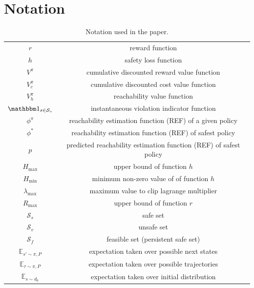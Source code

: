 \documentclass{article}
\theoremstyle{definition}
\DeclareMathOperator*{\E}{\mathbb{E}}
\begin{document}
\newpage

\appendix

\section{Notation}
\begin{table}[h]
    \centering
    \begin{tabular}{c|c}
         $r$& reward function \\
         $h$ & safety loss function\\
         $V^\pi$ & cumulative discounted reward value function \\
         $V^\pi_c$ & cumulative discounted cost value function \\
         $V^\pi_h$ & reachability value function\\
         $\mathbbm 1_{s\in \mathcal S_v} $ & instantaneous violation indicator function\\
         $\phi ^\pi$ & reachability estimation function (REF) of a given policy\\
         $\phi^*$ & reachability estimation function (REF) of safest policy \\
         $p$ & predicted reachability estimation function (REF) of safest policy\\
         $H_{\max}$ & upper bound of function $h$ \\
         $H_{\min}$ & minimum non-zero value of of function $h$ \\
         $\lambda_{\max}$ & maximum value to clip lagrange multiplier\\
         $R_{\max}$ & upper bound of function $r$ \\
         $\mathcal S_s$ &  safe set\\
         $\mathcal S_v$ &  unsafe set\\
         $\mathcal S_f$ &  feasible set (persistent safe set)\\
         $\E _{s' \sim \pi,P} $ & expectation taken over possible next states\\
         $\E _{\tau \sim \pi,P} $ & expectation taken over possible trajectories\\
         $\E_ {s \sim d_0}$ & expectation taken over initial distribution\\
    \end{tabular}
    \vspace{3mm}
    \caption{Notation used in the paper.}
    \label{tab:notation}
\end{table}
\end{document}
